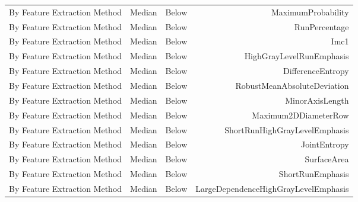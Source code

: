 {\begin{xltabular}{\textwidth}{X l l r}
By Feature Extraction Method & Median & Below & MaximumProbability \\
By Feature Extraction Method & Median & Below & RunPercentage \\
By Feature Extraction Method & Median & Below & Imc1 \\
By Feature Extraction Method & Median & Below & HighGrayLevelRunEmphasis \\
By Feature Extraction Method & Median & Below & DifferenceEntropy \\
By Feature Extraction Method & Median & Below & RobustMeanAbsoluteDeviation \\
By Feature Extraction Method & Median & Below & MinorAxisLength \\
By Feature Extraction Method & Median & Below & Maximum2DDiameterRow \\
By Feature Extraction Method & Median & Below & ShortRunHighGrayLevelEmphasis \\
By Feature Extraction Method & Median & Below & JointEntropy \\
By Feature Extraction Method & Median & Below & SurfaceArea \\
By Feature Extraction Method & Median & Below & ShortRunEmphasis \\
By Feature Extraction Method & Median & Below & LargeDependenceHighGrayLevelEmphasis \\


\end{xltabular}}
